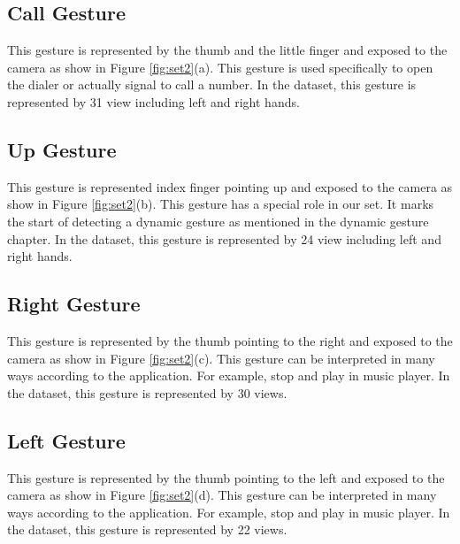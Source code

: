 \subsection{Call Gesture}
This gesture is represented by the thumb and the little finger and exposed to the camera as show in Figure \ref{fig:set2}(a). This gesture is used specifically to open the dialer or actually signal to call a number. In the dataset, this gesture is represented by 31 view including left and right hands.

\subsection{Up Gesture}
This gesture is represented index finger pointing up and exposed to the camera as show in Figure \ref{fig:set2}(b). This gesture has a special role in our set. It marks the start of detecting a dynamic gesture as mentioned in the dynamic gesture chapter. In the dataset, this gesture is represented by 24 view including left and right hands. 

\subsection{Right Gesture}
This gesture is represented by the thumb pointing to the right and exposed to the camera as show in Figure \ref{fig:set2}(c). This gesture can be interpreted in many ways according to the application. For example, stop and play in music player. In the dataset, this gesture is represented by 30 views. 

\subsection{Left Gesture}
This gesture is represented by the thumb pointing to the left and exposed to the camera as show in Figure \ref{fig:set2}(d). This gesture can be interpreted in many ways according to the application. For example, stop and play in music player. In the dataset, this gesture is represented by 22 views.

